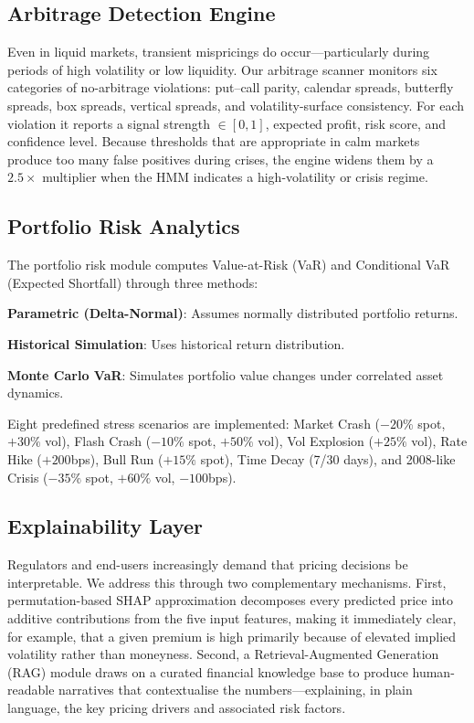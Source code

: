 \documentclass[conference]{IEEEtran}
\begin{document}
\subsection{Arbitrage Detection Engine}

Even in liquid markets, transient mispricings do occur---particularly during periods of high volatility or low liquidity. Our arbitrage scanner monitors six categories of no-arbitrage violations: put--call parity, calendar spreads, butterfly spreads, box spreads, vertical spreads, and volatility-surface consistency. For each violation it reports a signal strength $\in [0, 1]$, expected profit, risk score, and confidence level. Because thresholds that are appropriate in calm markets produce too many false positives during crises, the engine widens them by a $2.5\times$ multiplier when the HMM indicates a high-volatility or crisis regime.

\subsection{Portfolio Risk Analytics}

The portfolio risk module computes Value-at-Risk (VaR) and Conditional VaR (Expected Shortfall) through three methods:

\textbf{Parametric (Delta-Normal)}: Assumes normally distributed portfolio returns.

\textbf{Historical Simulation}: Uses historical return distribution.

\textbf{Monte Carlo VaR}: Simulates portfolio value changes under correlated asset dynamics.

Eight predefined stress scenarios are implemented: Market Crash ($-20\%$ spot, $+30\%$ vol), Flash Crash ($-10\%$ spot, $+50\%$ vol), Vol Explosion ($+25\%$ vol), Rate Hike ($+200$bps), Bull Run ($+15\%$ spot), Time Decay (7/30 days), and 2008-like Crisis ($-35\%$ spot, $+60\%$ vol, $-100$bps).

\subsection{Explainability Layer}

Regulators and end-users increasingly demand that pricing decisions be interpretable. We address this through two complementary mechanisms. First, permutation-based SHAP approximation decomposes every predicted price into additive contributions from the five input features, making it immediately clear, for example, that a given premium is high primarily because of elevated implied volatility rather than moneyness. Second, a Retrieval-Augmented Generation (RAG) module draws on a curated financial knowledge base to produce human-readable narratives that contextualise the numbers---explaining, in plain language, the key pricing drivers and associated risk factors.
\end{document}
